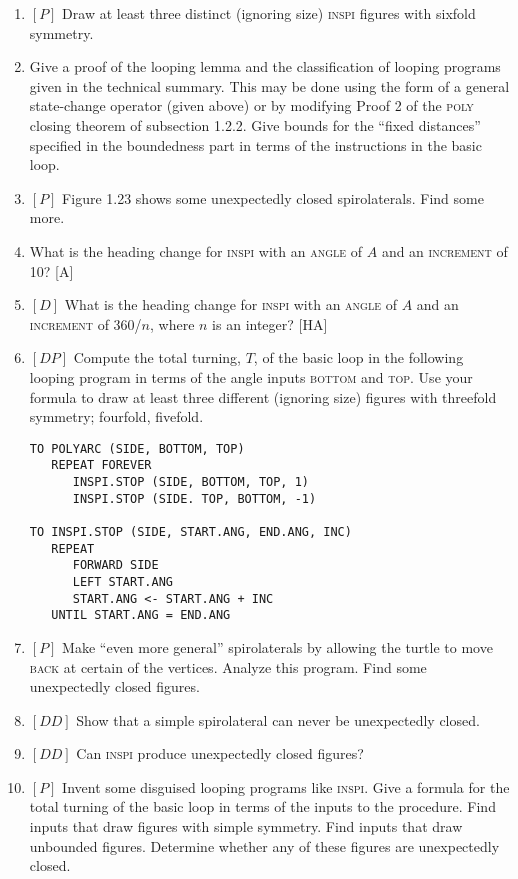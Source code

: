 \documentclass{book}
\begin{document}
\begin{enumerate}
\item $[P]$ Draw at least three distinct (ignoring size) \textsc{inspi} figures with
sixfold symmetry.
\item Give a proof of the looping lemma and the classification of looping
programs given in the technical summary. This may be done using the
form of a general state-change operator (given above) or by modifying
Proof 2 of the \textsc{poly} closing theorem of subsection 1.2.2. Give bounds
for the ``fixed distances'' specified in the boundedness part in terms of
the instructions in the basic loop.
\item $[P]$ Figure 1.23 shows some unexpectedly closed spirolaterals. Find
some more.
\item What is the heading change for \textsc{inspi} with an \textsc{angle} of $A$ and an
\textsc{increment} of 10? [A]
\item $[D]$ What is the heading change for \textsc{inspi} with an \textsc{angle} of $A$ and
an \textsc{increment} of 360/$n$, where $n$ is an integer? [HA]
\item $[DP]$ Compute the total turning, $T$, of the basic loop in the following
looping program in terms of the angle inputs \textsc{bottom} and \textsc{top}. Use
your formula to draw at least three different (ignoring size) figures with
threefold symmetry; fourfold, fivefold.  

\begin{verbatim}
TO POLYARC (SIDE, BOTTOM, TOP)
   REPEAT FOREVER
      INSPI.STOP (SIDE, BOTTOM, TOP, 1)
      INSPI.STOP (SIDE. TOP, BOTTOM, -1)

TO INSPI.STOP (SIDE, START.ANG, END.ANG, INC)
   REPEAT
      FORWARD SIDE
      LEFT START.ANG
      START.ANG <- START.ANG + INC
   UNTIL START.ANG = END.ANG
\end{verbatim}
\item $[P]$ Make ``even more general'' spirolaterals by allowing the turtle to
move \textsc{back} at certain of the vertices. Analyze this program. Find some
unexpectedly closed figures.
\item $[DD]$ Show that a simple spirolateral can never be unexpectedly
closed.  
\item $[DD]$ Can \textsc{inspi} produce unexpectedly closed figures?
\item $[P]$ Invent some disguised looping programs like \textsc{inspi}. Give a
formula for the total turning of the basic loop in terms of the inputs
to the procedure. Find inputs that draw figures with simple symmetry.
Find inputs that draw unbounded figures. Determine whether any of
these figures are unexpectedly closed.


\end{enumerate}
\end{document}
